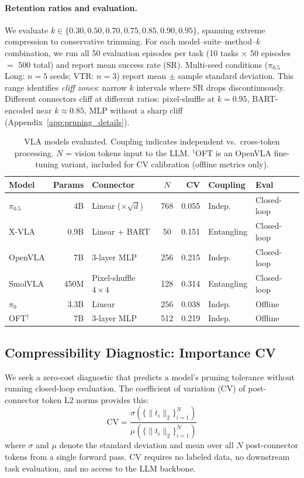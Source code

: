 \paragraph{Retention ratios and evaluation.}
We evaluate $k \in \{0.30, 0.50, 0.70, 0.75, 0.85, 0.90, 0.95\}$, spanning extreme compression to conservative trimming. For each model--suite--method--$k$ combination, we run all 50 evaluation episodes per task (10 tasks $\times$ 50 episodes $=$ 500 total) and report mean success rate (SR). Multi-seed conditions ($\pi_{0.5}$ Long: $n{=}5$ seeds; VTR: $n{=}3$) report mean $\pm$ sample standard deviation. This range identifies \emph{cliff zones}: narrow $k$ intervals where SR drops discontinuously. Different connectors cliff at different ratios: pixel-shuffle at $k{=}0.95$, BART-encoded near $k{\approx}0.85$, MLP without a sharp cliff (Appendix~\ref{app:pruning_details}).

\begin{table}[t]
\centering
\small
\caption{VLA models evaluated. Coupling indicates independent vs.\ cross-token processing. $N$ = vision tokens input to the LLM. $^\dagger$OFT is an OpenVLA fine-tuning variant, included for CV calibration (offline metrics only).}
\label{tab:model_properties}
\begin{tabular}{lrlcrll}
\toprule
Model & Params & Connector & $N$ & CV & Coupling & Eval \\
\midrule
$\pi_{0.5}$ & 4B & Linear ($\times\!\sqrt{d}$) & 768 & 0.055 & Indep.\ & Closed-loop \\
X-VLA & 0.9B & Linear + BART & 50 & 0.151 & Entangling & Closed-loop \\
OpenVLA & 7B & 3-layer MLP & 256 & 0.215 & Indep.\ & Closed-loop \\
SmolVLA & 450M & Pixel-shuffle $4{\times}4$ & 128 & 0.314 & Entangling & Closed-loop \\
\midrule
$\pi_{0}$ & 3.3B & Linear & 256 & 0.038 & Indep.\ & Offline \\
OFT$^\dagger$ & 7B & 3-layer MLP & 512 & 0.219 & Indep.\ & Offline \\
\bottomrule
\end{tabular}
\end{table}

\subsection{Compressibility Diagnostic: Importance CV}
\label{sec:cv_diagnostic}

We seek a zero-cost diagnostic that predicts a model's pruning tolerance without running closed-loop evaluation. The coefficient of variation (CV) of post-connector token L2 norms provides this:
\begin{equation}
\text{CV} = \frac{\sigma\!\left(\{\|t_i\|_2\}_{i=1}^{N}\right)}{\mu\!\left(\{\|t_i\|_2\}_{i=1}^{N}\right)}
\label{eq:cv}
\end{equation}
where $\sigma$ and $\mu$ denote the standard deviation and mean over all $N$ post-connector tokens from a single forward pass. CV requires no labeled data, no downstream task evaluation, and no access to the LLM backbone.

